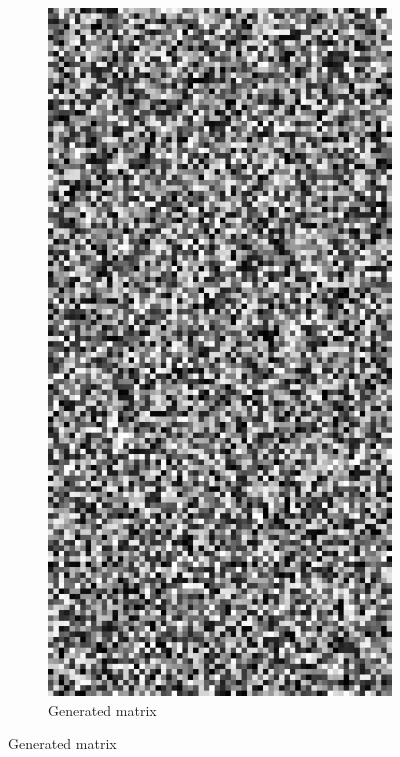\documentclass{llncs}
\begin{document}
\begin{figure}
\centering
\begin{subfigure}[t]{0.25\textwidth}
\centering
\includegraphics[scale=.9]{img/exp_input_2.png}
\caption{Generated matrix}
\label{fig-example1a}

\end{subfigure}
\end{figure}
\end{document}
